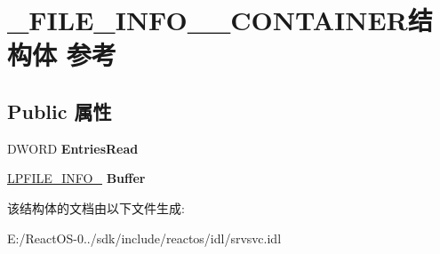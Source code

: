 \hypertarget{struct___f_i_l_e___i_n_f_o__2___c_o_n_t_a_i_n_e_r}{}\section{\+\_\+\+F\+I\+L\+E\+\_\+\+I\+N\+F\+O\+\_\+\_\+\+C\+O\+N\+T\+A\+I\+N\+E\+R结构体 参考}
\label{struct___f_i_l_e___i_n_f_o__2___c_o_n_t_a_i_n_e_r}
\subsection*{Public 属性}
\begin{DoxyCompactItemize}
\item 
\mbox{\label{struct___f_i_l_e___i_n_f_o__2___c_o_n_t_a_i_n_e_r_a9915543edd377e51d9a37a55e4b90903}} 
D\+W\+O\+RD {\bfseries Entries\+Read}
\item 
\mbox{\label{struct___f_i_l_e___i_n_f_o__2___c_o_n_t_a_i_n_e_r_af9facb4cc4abe0c3168dc82b8719e7ec}} 
\hyperlink{struct___f_i_l_e___i_n_f_o__2}{L\+P\+F\+I\+L\+E\+\_\+\+I\+N\+F\+O\+\_} {\bfseries Buffer}
\end{DoxyCompactItemize}


该结构体的文档由以下文件生成\+:\begin{DoxyCompactItemize}
\item 
E\+:/\+React\+O\+S-\/0../sdk/include/reactos/idl/srvsvc.\+idl\end{DoxyCompactItemize}
